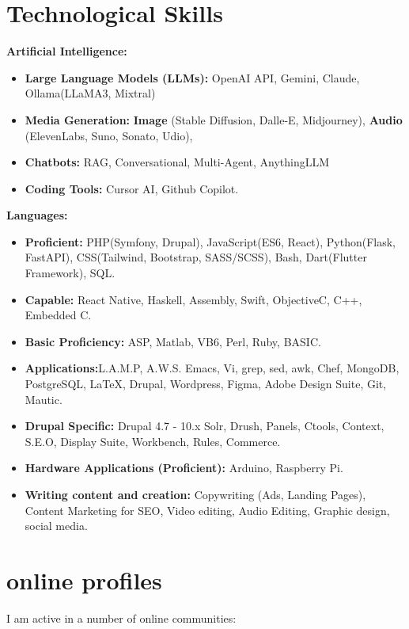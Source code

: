 \documentclass[]{friggeri-cv} %
\begin{document}
\section{Technological Skills}
\textbf{Artificial Intelligence:}
\begin{itemize}
\item \textbf{Large Language Models (LLMs): } OpenAI API, Gemini, Claude, Ollama(LLaMA3, Mixtral)
\item \textbf{Media Generation:} \textbf{Image} (Stable Diffusion, Dalle-E, Midjourney), \textbf{Audio} (ElevenLabs, Suno, Sonato, Udio),
\item \textbf{Chatbots:} RAG, Conversational, Multi-Agent, AnythingLLM
\item \textbf{Coding Tools:} Cursor AI, Github Copilot.
\end{itemize}
\textbf{Languages:}
\begin{itemize}
\item \textbf{Proficient: }PHP(Symfony, Drupal), JavaScript(ES6, React), Python(Flask, FastAPI), CSS(Tailwind, Bootstrap, SASS/SCSS), Bash, Dart(Flutter Framework), SQL.
\item \textbf{Capable: } React Native, Haskell, Assembly, Swift, Objective\-C, C++, Embedded C.
\item \textbf{Basic Proficiency: }ASP, Matlab, VB6, Perl, Ruby, BASIC.
\item \textbf{Applications:}L.A.M.P, A.W.S. Emacs, Vi, grep, sed, awk, Chef, MongoDB, PostgreSQL, \LaTeX, Drupal, Wordpress, Figma, Adobe Design Suite, Git, Mautic.
\item \textbf{Drupal Specific: } Drupal 4.7 - 10.x Solr, Drush, Panels, Ctools, Context, S.E.O, Display Suite, Workbench, Rules, Commerce.
\item \textbf{Hardware Applications (Proficient):} Arduino, Raspberry Pi.
\item \textbf{Writing content and creation:} Copywriting (Ads, Landing Pages), Content Marketing for SEO, Video editing, Audio Editing, Graphic design, social media.
\end{itemize}


\section{online profiles}
I am active in a number of online communities:
\end{document}
